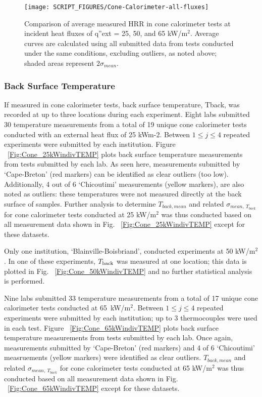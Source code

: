 \documentclass{book}
\begin{document}
\begin{figure}
  \centering
  \texttt{[image: SCRIPT\_FIGURES/Cone-Calorimeter-all-fluxes]}
  \caption{Comparison of average measured HRR in cone calorimeter tests at incident heat fluxes of q”ext = 25, 50, and 65 kW/m$^2$. Average curves are calculated using all submitted data from tests conducted under the same conditions, excluding outliers, as noted above; shaded areas represent $2\sigma_{mean}$.}
  \label{Fig:Cone-Calorimeter-all-fluxes}
\end{figure}


\subsubsection{Back Surface Temperature}

If measured in cone calorimeter tests, back surface temperature, Tback, was recorded at up to three locations during each experiment. Eight labs submitted 30 temperature measurements from a total of 19 unique cone calorimeter tests conducted with an external heat flux of 25 kWm-2. Between $1\le j\le4$ repeated experiments were submitted by each institution.  Figure ~\ref{Fig:Cone_25kWindivTEMP} plots back surface temperature measurements from tests submitted by each lab. As seen here, measurements submitted by ‘Cape-Breton’ (red markers) can be identified as clear outliers (too low). Additionally, 4 out of 6 ‘Chicoutimi’ measurements (yellow markers), are also noted as outliers: these temperatures were not measured directly at the back surface of samples. Further analysis to determine $T_{back,mean}$ and related $\sigma_{mean,\ T_{back}}$ for cone calorimeter tests conducted at 25 kW/m$^2$ was thus conducted based on all measurement data shown in Fig. ~\ref{Fig:Cone_25kWindivTEMP} except for these datasets.

Only one institution, ‘Blainville-Boisbriand’, conducted experiments at 50 kW/m$^2$. In one of these experiments, $T_{\rm back}$ was measured at one location; this data is plotted in Fig. ~\ref{Fig:Cone_50kWindivTEMP} and no further statistical analysis is performed.

Nine labs submitted 33 temperature measurements from a total of 17 unique cone calorimeter tests conducted at 65~kW/m$^2$. Between $1\le j\le4$ repeated experiments were submitted by each institution; up to 3 thermocouples were used in each test. Figure ~\ref{Fig:Cone_65kWindivTEMP} plots back surface temperature measurements from tests submitted by each lab. Once again, measurements  submitted by ‘Cape-Breton’ (red markers) and 4 of 6 ‘Chicoutimi’ measruements (yellow markers) were identified as clear outliers. $T_{back,mean}$ and related $\sigma_{mean,\ T_{back}}$ for cone calorimeter tests conducted at 65 kW/m$^2$ was thus conducted based on all measurement data shown in Fig. ~\ref{Fig:Cone_65kWindivTEMP} except for these datasets.
\end{document}
